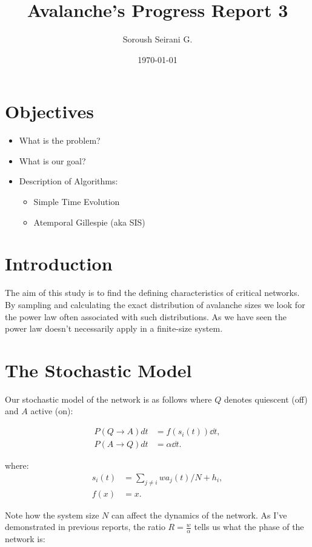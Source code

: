 \documentclass{article}
\author{Soroush Seirani G.}
\date{\today}
\title{Avalanche's Progress Report 3}
\begin{document}
\maketitle
\section{Objectives}
\label{sec:org316675c}
\begin{itemize}
\item What is the problem?
\item What is our goal?
\item Description of Algorithms:
\begin{itemize}
\item Simple Time Evolution
\item Atemporal Gillespie (aka SIS)
\end{itemize}
\end{itemize}
\section{Introduction}
\label{sec:org2da7e40}

The aim of this study is to find the defining characteristics of
critical networks. By sampling and calculating the exact distribution
of avalanche sizes we look for the power law often associated with
such distributions. As we have seen the power law doesn't necessarily
apply in a finite-size system.
\section{The Stochastic Model}
\label{sec:org1197347}

Our stochastic model of the network is as follows where \(Q\) denotes
quiescent (off) and \(A\) active (on):

\begin{align}
  P(Q\rightarrow A) dt &= f(s_i(t))\dd t,\\
  P(A\rightarrow Q) dt &= \alpha \dd t.
\end{align}

where:
\begin{align}
  s_i(t)&=\sum_{j\ne i} wa_j(t)/N+h_i,\\
  f(x)&=x.
\end{align}

Note how the system size \(N\) can affect the dynamics of the
network. As I've demonstrated in previous reports, the ratio
\(R=\frac{w}{\alpha}\) tells us what the phase of the network is:
\end{document}
